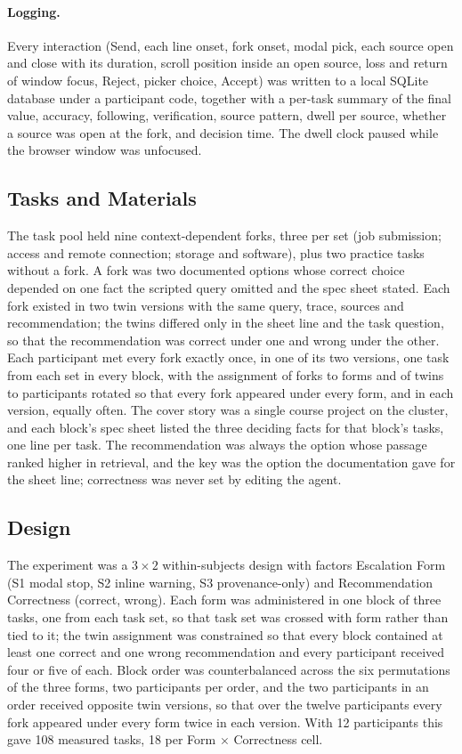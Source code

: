 \documentclass[manuscript,review]{acmart}
\begin{document}
\paragraph{Logging.} Every interaction (Send, each line onset, fork onset,
modal pick, each source open and close with its duration, scroll position
inside an open source, loss and return of window focus, Reject, picker
choice, Accept) was written to a local SQLite database under a participant
code, together with a per-task summary of the final value, accuracy,
following, verification, source pattern, dwell per source, whether a
source was open at the fork, and decision time. The dwell clock paused
while the browser window was unfocused.

\subsection{Tasks and Materials}
\label{sec:tasks}
The task pool held nine context-dependent forks, three per set (job
submission; access and remote connection; storage and software), plus two
practice tasks without a fork. A fork was two documented options whose
correct choice depended on one fact the scripted query omitted and the
spec sheet stated. Each fork existed in two twin versions with the same
query, trace, sources and recommendation; the twins differed only in the
sheet line and the task question, so that the recommendation was correct
under one and wrong under the other. Each participant met every fork
exactly once, in one of its two versions, one task from each set in every
block, with the assignment of forks to forms and of twins to participants
rotated so that every fork appeared under every form, and in each version,
equally often. The cover story was a single
course project on the cluster, and each block's spec sheet listed the
three deciding facts for that block's tasks, one line per task. The
recommendation was always the option whose passage ranked higher in
retrieval, and the key was the option the documentation gave for the
sheet line; correctness was never set by editing the agent.

\subsection{Design}
\label{sec:design}
The experiment was a $3\times2$ within-subjects design with factors
Escalation Form (S1 modal stop, S2 inline warning, S3 provenance-only) and
Recommendation Correctness (correct, wrong). Each form was administered in
one block of three tasks, one from each task set, so that task set was
crossed with form rather than tied to it; the twin assignment was
constrained so that every block contained at least one correct and one
wrong recommendation and every participant received four or five of each.
Block order was counterbalanced across the six permutations of the three
forms, two participants per order, and the two participants in an order
received opposite twin versions, so that over the twelve participants
every fork appeared under every form twice in each version. With 12
participants this gave 108 measured tasks, 18 per Form $\times$
Correctness cell.
\end{document}

